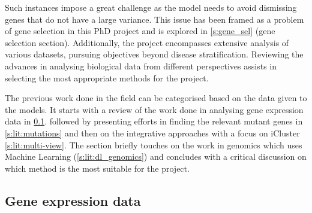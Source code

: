 Such instances impose a great challenge as the model needs to avoid dismissing genes that do not have a large variance. This issue has been framed as a problem of gene selection in this PhD project and is explored in \cref{s:gene_sel} (gene selection section). Additionally, the project encompasses extensive analysis of various datasets, pursuing objectives beyond disease stratification. Reviewing the advances in analysing biological data from different perspectives assists in selecting the most appropriate methods for the project.


The previous work done in the field can be categorised based on the data given to the models. 
It starts with a review of the work done in analysing gene expression data in \ref{s:lit:rnaSeq}. followed by presenting efforts in finding the relevant mutant genes in \ref{s:lit:mutations} and then on the integrative approaches with a focus on iCluster \ref{s:lit:multi-view}. The section briefly touches on the work in genomics which uses Machine Learning (\ref{s:lit:dl_genomics}) and concludes with a critical discussion on which method is the most suitable for the project.

\subsection{Gene expression data} \label{s:lit:rnaSeq}

\vspace{3mm}
\vspace{3mm}

